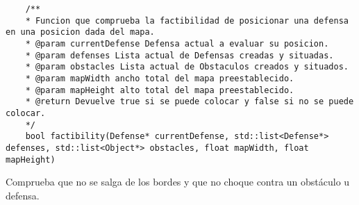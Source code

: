 \begin{lstlisting}
	/**
	* Funcion que comprueba la factibilidad de posicionar una defensa en una posicion dada del mapa.
	* @param currentDefense Defensa actual a evaluar su posicion.
	* @param defenses Lista actual de Defensas creadas y situadas.
	* @param obstacles Lista actual de Obstaculos creados y situados.
	* @param mapWidth ancho total del mapa preestablecido.
	* @param mapHeight alto total del mapa preestablecido.
	* @return Devuelve true si se puede colocar y false si no se puede colocar.
	*/
	bool factibility(Defense* currentDefense, std::list<Defense*> defenses, std::list<Object*> obstacles, float mapWidth, float mapHeight)
\end{lstlisting}

Comprueba que no se salga de los bordes y que no choque contra un obstáculo u defensa.